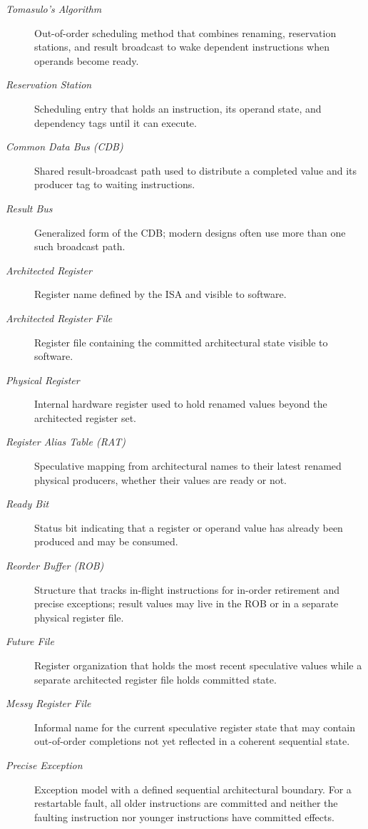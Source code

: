 \begin{description}
    \item[\textit{Tomasulo's Algorithm}] Out-of-order scheduling method that combines renaming, reservation stations, and result broadcast to wake dependent instructions when operands become ready.
    \item[\textit{Reservation Station}] Scheduling entry that holds an instruction, its operand state, and dependency tags until it can execute.
    \item[\textit{Common Data Bus (CDB)}] Shared result-broadcast path used to distribute a completed value and its producer tag to waiting instructions.
    \item[\textit{Result Bus}] Generalized form of the CDB; modern designs often use more than one such broadcast path.
    \item[\textit{Architected Register}] Register name defined by the ISA and visible to software.
    \item[\textit{Architected Register File}] Register file containing the committed architectural state visible to software.
    \item[\textit{Physical Register}] Internal hardware register used to hold renamed values beyond the architected register set.
    \item[\textit{Register Alias Table (RAT)}] Speculative mapping from architectural names to their latest renamed physical producers, whether their values are ready or not.
    \item[\textit{Ready Bit}] Status bit indicating that a register or operand value has already been produced and may be consumed.
    \item[\textit{Reorder Buffer (ROB)}] Structure that tracks in-flight instructions for in-order retirement and precise exceptions; result values may live in the ROB or in a separate physical register file.
    \item[\textit{Future File}] Register organization that holds the most recent speculative values while a separate architected register file holds committed state.
    \item[\textit{Messy Register File}] Informal name for the current speculative register state that may contain out-of-order completions not yet reflected in a coherent sequential state.
    \item[\textit{Precise Exception}] Exception model with a defined sequential architectural boundary. For a restartable fault, all older instructions are committed and neither the faulting instruction nor younger instructions have committed effects.

\end{description}
